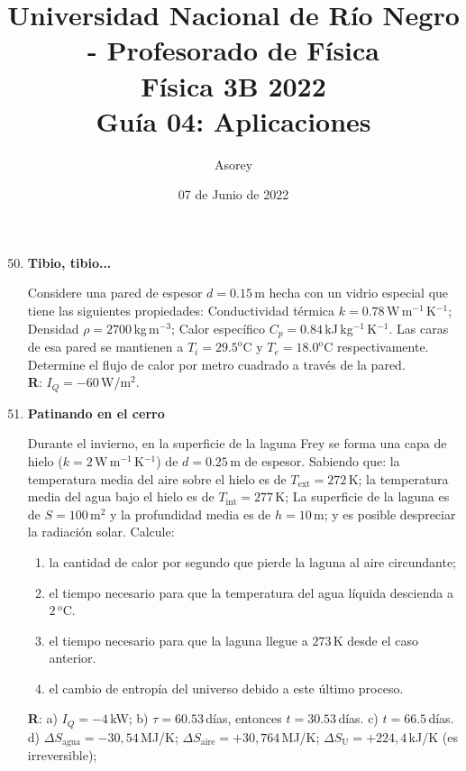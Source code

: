 \documentclass[a4paper,12pt]{article}
\begin{document}
\title{
{\normalsize{Universidad Nacional de Río Negro - Profesorado de Física}}\\
Física 3B 2022 \\ Guía 04: Aplicaciones
}
\author{Asorey}
\date{07 de Junio de 2022}
\maketitle

\begin{enumerate}
	\setcounter{enumi}{49}     

	\item{\bf{Tibio, tibio...}}

		Considere una pared de espesor $d=0.15$\,m hecha con un vidrio especial
		que tiene las siguientes propiedades: Conductividad térmica
		$k=0.78$\,W\,m$^{-1}$\,K$^{-1}$; Densidad $\rho = 2700$\,kg\,m$^{-3}$;
		Calor específico $C_p = 0.84$\,kJ\,kg$^{-1}$\,K$^{-1}$.  Las caras de
		esa pared se mantienen a $T_i=29.5^\mathrm{o}$C y
		$T_e=18.0^\mathrm{o}$C respectivamente. Determine el flujo de calor por
		metro cuadrado a través de la pared.
		\\{\bf{R}}: $I_Q=-60$\,W/m$^2$.
	
	\item{\bf{Patinando en el cerro}}
		
		Durante el invierno, en la superficie de la laguna Frey se forma una
		capa de hielo ($k=2$\,W\,m$^{-1}$\,K$^{-1}$) de $d=0.25$\,m de espesor.
		Sabiendo que: la temperatura media del aire sobre el hielo es de
		$T_\mathrm{ext}=272$\,K; la temperatura media del agua bajo el hielo es
		de $T_\mathrm{int}=277$\,K; La superficie de la laguna es de
		$S=100$\,m$^2$ y la profundidad media es de $h=10$\,m; y es posible
		despreciar la radiación solar. Calcule:
		\begin{enumerate}
			\item la cantidad de calor por segundo que pierde la laguna al
				aire circundante;
			\item el tiempo necesario para que la temperatura del agua líquida
				descienda a $2$\,$^\mathrm{o}$C.
			\item el tiempo necesario para que la laguna llegue a $273$\,K
				desde el caso anterior.
			\item el cambio de entropía del universo debido a este último proceso.
		\end{enumerate}
		{\bf{R}}: a) $I_Q=-4$\,kW; b) $\tau=60.53$\,días, entonces
		$t=30.53$\,días. c) $t=66.5$\,días. d) $\Delta
		S_{\mathrm{agua}}=-30,54$\,MJ/K; $\Delta
		S_{\mathrm{aire}}=+30,764$\,MJ/K; $\Delta S_{\mathrm{U}}=+224,4$\,kJ/K
		(es irreversible);
	

\end{enumerate}
\end{document}

